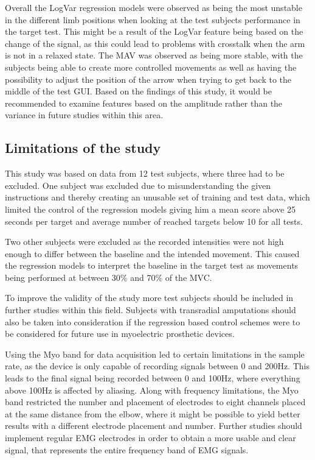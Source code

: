 Overall the LogVar regression models were observed as being the most unstable in the different limb positions when looking at the test subjects performance in the target test. This might be a result of the LogVar feature being based on the change of the signal, as this could lead to problems with crosstalk when the arm is not in a relaxed state. The MAV was observed as being more stable, with the subjects being able to create more controlled movements as well as having the possibility to adjust the position of the arrow when trying to get back to the middle of the test GUI. Based on the findings of this study, it would be recommended to examine features based on the amplitude rather than the variance in future studies within this area.

\subsection{Limitations of the study}
This study was based on data from 12 test subjects, where three had to be excluded. One subject was excluded due to misunderstanding the given instructions and thereby creating an unusable set of training and test data, which limited the control of the regression models giving him a mean score above 25 seconds per target and average number of reached targets below 10 for all tests.

Two other subjects were excluded as the recorded intensities were not high enough to differ between the baseline and the intended movement. This caused the regression models to interpret the baseline in the target test as movements being performed at between 30\% and 70\% of the MVC.

To improve the validity of the study more test subjects should be included in further studies within this field. Subjects with transradial amputations should also be taken into consideration if the regression based control schemes were to be considered for future use in myoelectric prosthetic devices. 

Using the Myo band for data acquisition led to certain limitations in the sample rate, as the device is only capable of recording signals between 0 and 200Hz. This leads to the final signal being recorded between 0 and 100Hz, where everything above 100Hz is affected by aliasing. Along with frequency limitations, the Myo band restricted the number and placement of electrodes to eight channels placed at the same distance from the elbow, where it might be possible to yield better results with a different electrode placement and number. Further studies should implement regular EMG electrodes in order to obtain a more usable and clear signal, that represents the entire frequency band of EMG signals.


